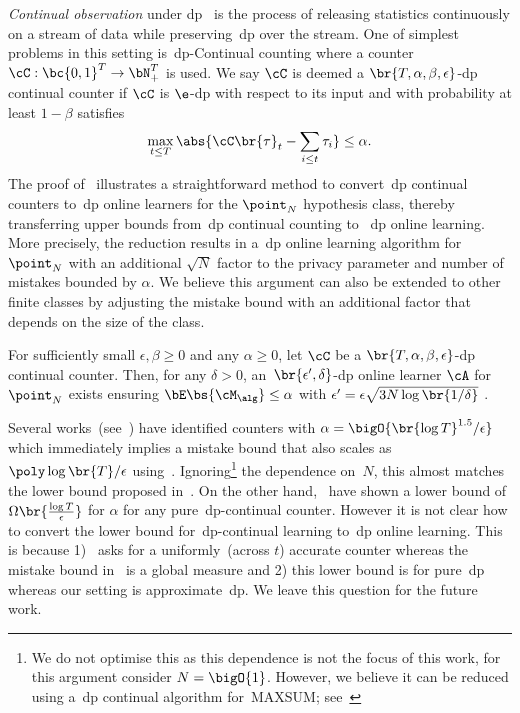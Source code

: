 
\emph{Continual observation} under \Gls{dp}~\citep{dwork2010boosting} is the process of releasing statistics continuously on a stream of data while preserving~\Gls{dp} over the stream. One of simplest problems in this setting is~\Gls{dp}-Continual counting where a counter \(\cC: \bc{0,1}^T\to\bN_{+}^T\) is used.
We say \(\cC\) is deemed a \(\br{T,\alpha,\beta,\epsilon}\)-\Gls{dp} continual counter if \(\cC\) is \(\e\)-\Gls{dp} with respect to its input and with probability at least \(1-\beta\) satisfies
\begin{equation}\label{eq:continual-counter}
\max_{t\leq T} \abs{\cC\br{\tau}_t - \sum_{i\leq t}\tau_i}\leq \alpha.
\end{equation}
The proof of~ illustrates a straightforward method to convert~\Gls{dp} continual counters to~\Gls{dp} online learners for the \(\point_N\) hypothesis class, thereby transferring upper bounds from~\Gls{dp} continual counting to ~\Gls{dp} online learning. 
More precisely, the reduction results in a~\Gls{dp} online learning algorithm for \(\point_N\) with an additional \(\sqrt{N}\) factor to the privacy parameter and number of mistakes bounded by \(\alpha\). 
We believe this argument can also be extended to other finite classes by adjusting the mistake bound with an additional factor that depends on the size of the class.

 \begin{proposition}
 \label{prop:continual}
    For sufficiently small \(\epsilon,\beta\geq 0\) and any \(\alpha\geq 0\), let \(\cC\) be a \(\br{T,\alpha,\beta,\epsilon}\)-\Gls{dp} continual counter. 
    Then, for any \(\delta>0\), an~\(\br{\epsilon',\delta}\)-\Gls{dp} online learner \(\cA\) for \(\point_N\) exists ensuring \(\bE\bs{\cM_{\alg}}\leq \alpha\) with \(\epsilon'=\epsilon\sqrt{3N\log\br{1 /\delta}}\) .
\end{proposition}

Several works~(see~\citet{chan2011private}) have identified counters with \(\alpha=\bigO{\br{\log T}^{1.5}/\epsilon}\) which immediately implies a mistake bound that also scales as \(\poly\log \br{T}/\epsilon\) using~. 
Ignoring\footnote{We do not optimise this as this dependence is not the focus of this work, for this argument consider \(N=\bigO{1}\). 
However, we believe it can be reduced using a~\Gls{dp} continual algorithm for~\textrm{MAXSUM}; see~\citet{jain2023price}} the dependence on~\(N\), this almost matches the lower bound proposed in~. 
On the other hand,~\citet{dwork2010differential} have shown a lower bound of \(\Omega\br{\frac{\log T}{\epsilon}}\) for \(\alpha\) for any pure~\Gls{dp}-continual counter. 
However it is not clear how to convert the lower bound for~\Gls{dp}-continual learning to~\Gls{dp} online learning. 
This is because 1)~ asks for a uniformly~(across \(t\)) accurate counter whereas the mistake bound in~ is a global measure and 2) this lower bound is for pure~\Gls{dp} whereas our setting is approximate~\Gls{dp}. 
We leave this question for the future work.
